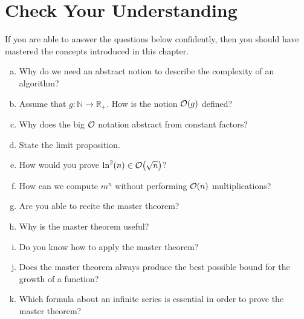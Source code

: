 \section{Check Your Understanding}
If you are able to answer the questions below confidently, then you should have mastered the concepts
introduced in this chapter.
\begin{enumerate}[(a)]
\item Why do we need an abstract notion to describe the complexity of an algorithm?  
\item Assume that $g:\mathbb{N} \rightarrow \mathbb{R}_+$.  How is the notion $\mathcal{O}(g)$ defined?
\item Why does the big $\mathcal{O}$ notation abstract from constant factors?  
\item State the limit proposition.
\item How would you prove $\ln^2(n) \in \mathcal{O}\bigl(\sqrt{n}\bigr)$?
\item How can we compute $m^n$ without performing $\mathcal{O}(n)$ multiplications?
\item Are you able to recite the master theorem?
\item Why is the master theorem useful?
\item Do you know how to apply the master theorem?
\item Does the master theorem always produce the best possible bound for the growth of a function?  
\item Which formula about an infinite series is essential in order to prove the master theorem?
\end{enumerate}

